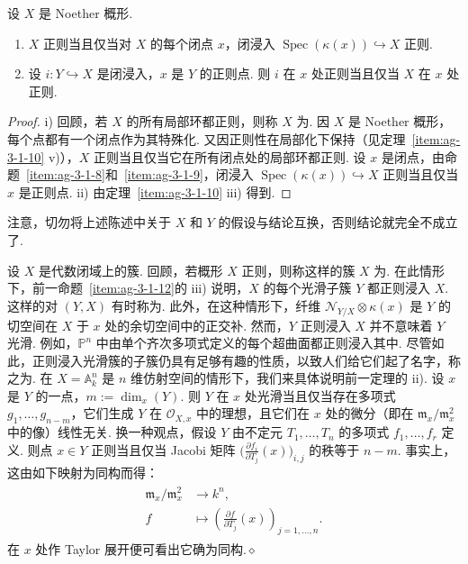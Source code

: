 \begin{corollary}\label{item:ag-3-1-12}
设 $X$ 是 Noether 概形.
\begin{enumerate}[label=\roman*)]
\item $X$ 正则当且仅当对 $X$ 的每个闭点 $x$，闭浸入 $\operatorname{Spec}(\kappa(x))\hookrightarrow X$ 正则.
\item 设 $i:Y\hookrightarrow X$ 是闭浸入，$x$ 是 $Y$ 的正则点. 则 $i$ 在 $x$ 处正则当且仅当 $X$ 在 $x$ 处正则.
\end{enumerate}
\end{corollary}
\begin{proof}
\textup{i)} 回顾，若 $X$ 的所有局部环都正则，则称 $X$ 为. 因 $X$ 是 Noether 概形，每个点都有一个闭点作为其特殊化. 又因正则性在局部化下保持（见定理~\ref{item:ag-3-1-10} v)），$X$ 正则当且仅当它在所有闭点处的局部环都正则. 设 $x$ 是闭点，由命题~\ref{item:ag-3-1-8}和~\ref{item:ag-3-1-9}，闭浸入 $\operatorname{Spec}(\kappa(x))\hookrightarrow X$ 正则当且仅当 $x$ 是正则点.
\textup{ii)} 由定理~\ref{item:ag-3-1-10} iii) 得到.
\end{proof}
注意，切勿将上述陈述中关于 $X$ 和 $Y$ 的假设与结论互换，否则结论就完全不成立了.
\begin{example}\label{item:ag-3-1-13}
设 $X$ 是代数闭域上的簇. 回顾，若概形 $X$ 正则，则称这样的簇 $X$ 为. 在此情形下，前一命题~\ref{item:ag-3-1-12}的 iii) 说明，$X$ 的每个光滑子簇 $Y$ 都正则浸入 $X$. 这样的对 $(Y,X)$ 有时称为. 此外，在这种情形下，纤维 $\mathcal N_{Y/X}\otimes\kappa(x)$ 是 $Y$ 的切空间在 $X$ 于 $x$ 处的余切空间中的正交补.
然而，$Y$ 正则浸入 $X$ 并不意味着 $Y$ 光滑. 例如，$\mathbb P^n$ 中由单个齐次多项式定义的每个超曲面都正则浸入其中. 尽管如此，正则浸入光滑簇的子簇仍具有足够有趣的性质，以致人们给它们起了名字，称之为.
在 $X=\mathbb A_k^n$ 是 $n$ 维仿射空间的情形下，我们来具体说明前一定理的 ii). 设 $x$ 是 $Y$ 的一点，$m:=\dim_x(Y)$. 则 $Y$ 在 $x$ 处光滑当且仅当存在多项式 $g_1,\ldots,g_{n-m}$，它们生成 $Y$ 在 $\mathcal O_{X,x}$ 中的理想，且它们在 $x$ 处的微分（即在 $\mathfrak m_x/\mathfrak m_x^2$ 中的像）线性无关. 换一种观点，假设 $Y$ 由不定元 $T_1,\ldots,T_n$ 的多项式 $f_1,\ldots,f_r$ 定义. 则点 $x\in Y$ 正则当且仅当 Jacobi 矩阵 $\bigl(\frac{\partial f_i}{\partial T_j}(x)\bigr)_{i,j}$ 的秩等于 $n-m$. 事实上，这由如下映射为同构而得：
\begin{align}
\begin{aligned}
\mathfrak m_x/\mathfrak m_x^2&\longrightarrow k^n,\\
f&\longmapsto\left(\frac{\partial f}{\partial T_j}(x)\right)_{j=1,\ldots,n}.
\end{aligned}\tag{3.1.13.1}\label{eq:ag-3-1-13-1}
\end{align}
在 $x$ 处作 Taylor 展开便可看出它确为同构.\unskip\nobreak\hfill\ensuremath{\diamond}
\renewcommand{\envenddiamond}{}
\end{example}
